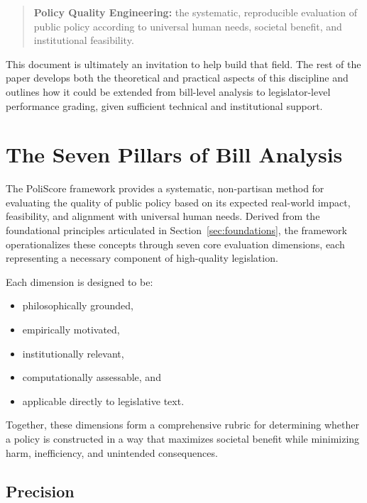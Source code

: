 \documentclass[12pt]{article}
\begin{document}
\begin{quote}
\textbf{Policy Quality Engineering:} the systematic, reproducible evaluation of public policy according to universal human
needs, societal benefit, and institutional feasibility.
\end{quote}

This document is ultimately an invitation to help build that field. The rest of the paper develops both the theoretical
and practical aspects of this discipline and outlines how it could be extended from bill-level analysis to legislator-level
performance grading, given sufficient technical and institutional support.


\section{The Seven Pillars of Bill Analysis}
\label{sec:framework}

The PoliScore framework provides a systematic, non-partisan method for evaluating the quality of public policy based on
its expected real-world impact, feasibility, and alignment with universal human needs. Derived from the foundational
principles articulated in Section~\ref{sec:foundations}, the framework operationalizes these concepts through seven core
evaluation dimensions, each representing a necessary component of high-quality legislation.

Each dimension is designed to be:
\begin{itemize}
    \item philosophically grounded,
    \item empirically motivated,
    \item institutionally relevant,
    \item computationally assessable, and
    \item applicable directly to legislative text.
\end{itemize}

Together, these dimensions form a comprehensive rubric for determining whether a policy is constructed in a way that
maximizes societal benefit while minimizing harm, inefficiency, and unintended consequences.

\subsection{Precision}
\end{document}
